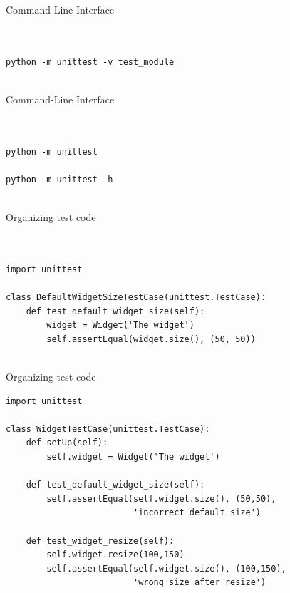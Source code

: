\documentclass{beamer}
\begin{document}
\begin{frame}[t,fragile]{Command-Line Interface}


\begin{verbatim}


python -m unittest -v test_module


\end{verbatim}


\end{frame}




\begin{frame}[t,fragile]{Command-Line Interface}


\begin{verbatim}


python -m unittest

python -m unittest -h


\end{verbatim}

\end{frame}


\begin{frame}[t,fragile]{Organizing test code}


\begin{verbatim}


import unittest

class DefaultWidgetSizeTestCase(unittest.TestCase):
    def test_default_widget_size(self):
        widget = Widget('The widget')
        self.assertEqual(widget.size(), (50, 50))


\end{verbatim}


\end{frame}



\begin{frame}[t,fragile]{Organizing test code}


\begin{verbatim}
import unittest

class WidgetTestCase(unittest.TestCase):
    def setUp(self):
        self.widget = Widget('The widget')

    def test_default_widget_size(self):
        self.assertEqual(self.widget.size(), (50,50),
                         'incorrect default size')

    def test_widget_resize(self):
        self.widget.resize(100,150)
        self.assertEqual(self.widget.size(), (100,150),
                         'wrong size after resize')
\end{verbatim}


\end{frame}
\end{document}
